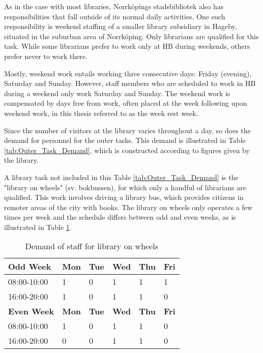 As in the case with most libraries, Norrköpings stadsbibliotek also has responsibilities that fall outside of its normal daily activities. One such responsibility is weekend staffing of a smaller library subsidiary in Hageby, situated in the suburban area of Norrköping. Only librarians are qualified for this task. While some librarians prefer to work only at HB during weekends, others prefer never to work there.

Mostly, weekend work entails working three consecutive days: Friday (evening), Saturday and Sunday. However, staff members who are scheduled to work in HB during a weekend only work Saturday and Sunday. The weekend work is compensated by days free from work, often placed at the week following upon weekend work, in this thesis referred to as the week rest week. 

Since the number of visitors at the library varies throughout a day, so does the demand for personnel for the outer tasks. This demand is illustrated in Table \ref{tab:Outer_Task_Demand}, which is constructed according to figures given by the library. 

A library task not included in this Table \ref{tab:Outer_Task_Demand} is the "library on wheels" (sv. bokbussen), for which only a handful of librarians are qualified. This work involves driving a library bus, which provides citizens in remoter areas of the city with books. The library on wheels only operates a few times per week and the schedule differs between odd and even weeks, as is illustrated in Table \ref{tab:LOW_Demand}.

\begin{table}[ht]
\centering
\caption{Demand of staff for library on wheels}
\label{tab:LOW_Demand}
\begin{tabularx}{0.80\textwidth}{|l|X|X|X|X|X|}
\hline
 \textbf{Odd Week} & \textbf{Mon} & \textbf{Tue} & \textbf{Wed} & \textbf{Thu} & \textbf{Fri} 
 \\ \hline 
\rowcolor{Gray} 
08:00-10:00 & 1 & 0 & 1 & 1 & 1 
\\ \hline 
\rowcolor{Gray} 
16:00-20:00 & 1 & 0 & 1 & 1 & 0 
\\ \hline 
 \textbf{Even Week} & \textbf{Mon} & \textbf{Tue} & \textbf{Wed} & \textbf{Thu} & \textbf{Fri} 
 \\ \hline 
\rowcolor{Gray} 
08:00-10:00 & 1 & 0 & 1 & 1 & 0 
\\ \hline 
\rowcolor{Gray} 
16:00-20:00 & 0 & 0 & 1 & 1 & 0 
\\ \hline 
\end{tabularx}
\end{table}

